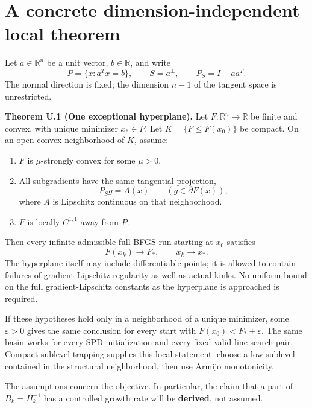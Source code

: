 \begingroup

\setcounter{section}{0}
\setcounter{theorem}{0}
\setcounter{lemma}{0}
\setcounter{corollary}{0}
\setcounter{proposition}{0}
\setcounter{remark}{0}
\setcounter{equation}{0}
\section{A concrete dimension-independent local
theorem}\label{U:a-concrete-dimension-independent-local-theorem}

Let \(a\in\mathbb R^n\) be a unit vector, \(b\in\mathbb R\), and write
\[
 P=\{x:a^Tx=b\},\qquad S=a^\perp,\qquad P_S=I-aa^T.
\] The normal direction is fixed; the dimension \(n-1\) of the tangent
space is unrestricted.

\label{U:one}\textbf{Theorem U.1 (One exceptional hyperplane).} Let
\(F:\mathbb R^n\to\mathbb R\) be finite and convex, with unique
minimizer \(x_*\in P\). Let \(K=\{F\le F(x_0)\}\) be compact. On an open
convex neighborhood of \(K\), assume:

\begin{enumerate}
\def\labelenumi{\arabic{enumi}.}
\tightlist
\item
  \(F\) is \(\mu\)-strongly convex for some \(\mu>0\).
\item
  All subgradients have the same tangential projection,
  \[P_Sg=A(x)\qquad(g\in\partial F(x)),\] where \(A\) is Lipschitz
  continuous on that neighborhood.
\item
  \(F\) is locally \(C^{1,1}\) away from \(P\).
\end{enumerate}

Then every infinite admissible full-BFGS run starting at \(x_0\)
satisfies \[
 \boxed{F(x_k)\to F_*,\qquad x_k\to x_*.}
\] The hyperplane itself may include differentiable points; it is
allowed to contain failures of gradient-Lipschitz regularity as well as
actual kinks. No uniform bound on the full gradient-Lipschitz constants
as the hyperplane is approached is required.

If these hypotheses hold only in a neighborhood of a unique minimizer,
some \(\varepsilon>0\) gives the same conclusion for every start with
\(F(x_0)<F_*+\varepsilon\). The same basin works for every SPD
initialization and every fixed valid line-search pair. Compact sublevel
trapping supplies this local statement: choose a low sublevel contained
in the structural neighborhood, then use Armijo monotonicity.

The assumptions concern the objective. In particular, the claim that a
part of \(B_k=H_k^{-1}\) has a controlled growth rate will be
\textbf{derived}, not assumed.

